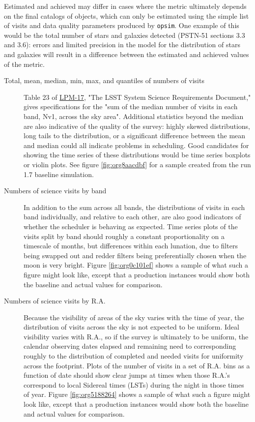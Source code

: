 Estimated and achieved may differ in cases where the metric ultimately depends on the final catalogs of objects, which can only be estimated using the simple list of visits and data quality parameters produced by \texttt{opsim}.
One example of this would be the total number of stars and galaxies detected (PSTN-51 sections 3.3 and 3.6): errors and limited precision in the model for the distribution of stars and galaxies will result in a difference between the estimated and achieved values of the metric.

\begin{description}
\item[{Total, mean, median, min, max, and quantiles of numbers of visits}] Table 23 of \href{http://ls.st/lpm-17}{LPM-17}, "The LSST System Science Requirements Document," gives specifications for the "sum of the median number of visits in each band, Nv1, across the sky area". Additional statistics beyond the median are also indicative of the quality of the survey: highly skewed distributions, long tails to the distribution, or a significant difference between the mean and median could all indicate problems in scheduling. Good candidates for showing the time series of these distributions would be time series boxplots or violin plots. See figure \ref{fig:org8aacdbf} for a sample created from the run 1.7 baseline simulation.
\item[{Numbers of science visits by band}] In addition to the sum across all bands, the distributions of visits in each band individually, and relative to each other, are also good indicators of whether the scheduler is behaving as expected. Time series plots of the visits split by band should roughly a constant proportionality on a timescale of months, but differences within each lunation, due to filters being swapped out and redder filters being preferentially chosen when the moon is very bright. Figure \ref{fig:org0c101ef} shows a sample of what such a figure might look like, except that a production instances would show both the baseline and actual values for comparison.
\item[{Numbers of science visits by R.A.}] Because the visibility of areas of the sky varies with the time of year, the distribution of visits across the sky is not expected to be uniform. Ideal visibility varies with R.A., so if the survey is ultimately to be uniform, the calendar observing dates elapsed and remaining need to corresponding roughly to the distribution of completed and needed visits for uniformity across the footprint. Plots of the number of visits in a set of R.A. bins as a function of date should show clear jumps at times when those R.A.'s correspond to local Sidereal times (LSTs) during the night in those times of year. Figure \ref{fig:org5188264} shows a sample of what such a figure might look like, except that a production instances would show both the baseline and actual values for comparison.

\end{description}
